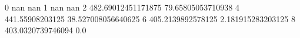 0 nan nan
1 nan nan
2 482.69012451171875 79.65805053710938
4 441.55908203125 38.527008056640625
6 405.2139892578125 2.181915283203125
8 403.0320739746094 0.0
